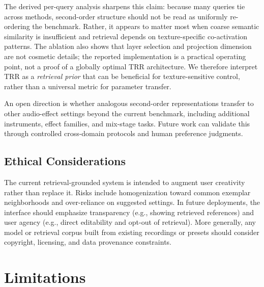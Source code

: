 The derived per-query analysis sharpens this claim: because many queries tie across methods, second-order structure should not be read as uniformly re-ordering the benchmark. Rather, it appears to matter most when coarse semantic similarity is insufficient and retrieval depends on texture-specific co-activation patterns. The ablation also shows that layer selection and projection dimension are not cosmetic details; the reported implementation is a practical operating point, not a proof of a globally optimal TRR architecture. We therefore interpret TRR as a \textit{retrieval prior} that can be beneficial for texture-sensitive control, rather than a universal metric for parameter transfer.

An open direction is whether analogous second-order representations transfer to other audio-effect settings beyond the current benchmark, including additional instruments, effect families, and mix-stage tasks. Future work can validate this through controlled cross-domain protocols and human preference judgments.

\subsection{Ethical Considerations}

The current retrieval-grounded system is intended to augment user creativity rather than replace it. Risks include homogenization toward common exemplar neighborhoods and over-reliance on suggested settings. In future deployments, the interface should emphasize transparency (e.g., showing retrieved references) and user agency (e.g., direct editability and opt-out of retrieval). More generally, any model or retrieval corpus built from existing recordings or presets should consider copyright, licensing, and data provenance constraints.

\section{Limitations}
\label{sec:limitations}

